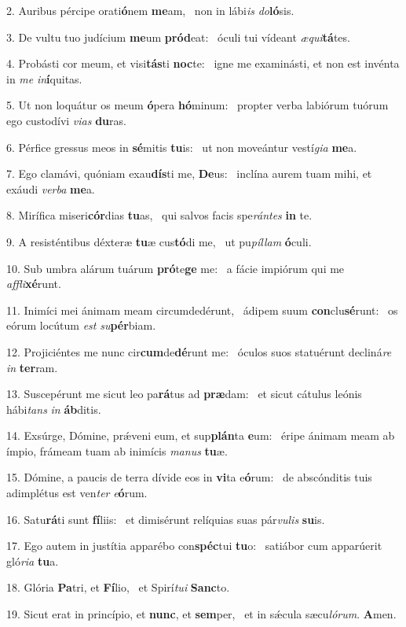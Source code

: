 2. Auribus pércipe orati\textbf{ó}nem \textbf{me}am, \ast\  non in lábi\textit{is} \textit{do}\textbf{ló}sis.\

3. De vultu tuo judícium \textbf{me}um \textbf{pród}eat: \ast\  óculi tui vídeant \textit{æ}\textit{qui}\textbf{tá}tes.\

4. Probásti cor meum, et visi\textbf{tás}ti \textbf{noc}te: \ast\  igne me examinásti, et non est invénta in \textit{me} \textit{in}\textbf{í}quitas.\

5. Ut non loquátur os meum \textbf{ó}pera \textbf{hó}minum: \ast\  propter verba labiórum tuórum ego custodívi \textit{vi}\textit{as} \textbf{du}ras.\

6. Pérfice gressus meos in \textbf{sé}mitis \textbf{tu}is: \ast\  ut non moveántur vestí\textit{gi}\textit{a} \textbf{me}a.\

7. Ego clamávi, quóniam exau\textbf{dís}ti me, \textbf{De}us: \ast\  inclína aurem tuam mihi, et exáudi \textit{ver}\textit{ba} \textbf{me}a.\

8. Mirífica miseri\textbf{cór}dias \textbf{tu}as, \ast\  qui salvos facis spe\textit{rán}\textit{tes} \textbf{in} te.\

9. A resisténtibus déxteræ \textbf{tu}æ cus\textbf{tó}di me, \ast\  ut pu\textit{píl}\textit{lam} \textbf{ó}culi.\

10. Sub umbra alárum tuárum \textbf{pró}te\textbf{ge} me: \ast\  a fácie impiórum qui me \textit{af}\textit{fli}\textbf{xé}runt.\

11. Inimíci mei ánimam meam circumdedérunt, \dag\  ádipem suum \textbf{con}clu\textbf{sé}runt: \ast\  os eórum locútum \textit{est} \textit{su}\textbf{pér}biam.\

12. Projiciéntes me nunc cir\textbf{cum}de\textbf{dé}runt me: \ast\  óculos suos statuérunt decliná\textit{re} \textit{in} \textbf{ter}ram.\

13. Suscepérunt me sicut leo pa\textbf{rá}tus ad \textbf{præ}dam: \ast\  et sicut cátulus leónis hábi\textit{tans} \textit{in} \textbf{áb}ditis.\

14. Exsúrge, Dómine, prǽveni eum, et sup\textbf{plán}ta \textbf{e}um: \ast\  éripe ánimam meam ab ímpio, frámeam tuam ab inimícis \textit{ma}\textit{nus} \textbf{tu}æ.\

15. Dómine, a paucis de terra dívide eos in \textbf{vi}ta e\textbf{ó}rum: \ast\  de abscónditis tuis adimplétus est ven\textit{ter} \textit{e}\textbf{ó}rum.\

16. Satu\textbf{rá}ti sunt \textbf{fí}liis: \ast\  et dimisérunt relíquias suas pár\textit{vu}\textit{lis} \textbf{su}is.\

17. Ego autem in justítia apparébo con\textbf{spéc}tui \textbf{tu}o: \ast\  satiábor cum apparúerit gló\textit{ri}\textit{a} \textbf{tu}a.\

18. Glória \textbf{Pa}tri, et \textbf{Fí}lio, \ast\  et Spirí\textit{tu}\textit{i} \textbf{Sanc}to.\

19. Sicut erat in princípio, et \textbf{nunc}, et \textbf{sem}per, \ast\  et in sǽcula sæcu\textit{ló}\textit{rum}. \textbf{A}men.\

